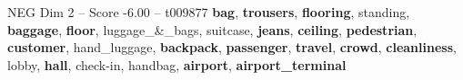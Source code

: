 \begin{textsample}{NEG Dim 2 – Score -6.00 – t009877}  \label{ex:f2_neg_003}
\textbf{bag}, \textbf{trousers}, \textbf{flooring}, standing, \textbf{baggage}, \textbf{floor}, luggage\_\&\_bags, suitcase, \textbf{jeans}, \textbf{ceiling}, \textbf{pedestrian}, \textbf{customer}, hand\_luggage, \textbf{backpack}, \textbf{passenger}, \textbf{travel}, \textbf{crowd}, \textbf{cleanliness}, lobby, \textbf{hall}, check-in, handbag, \textbf{airport}, \textbf{airport\_terminal}

\end{textsample}
